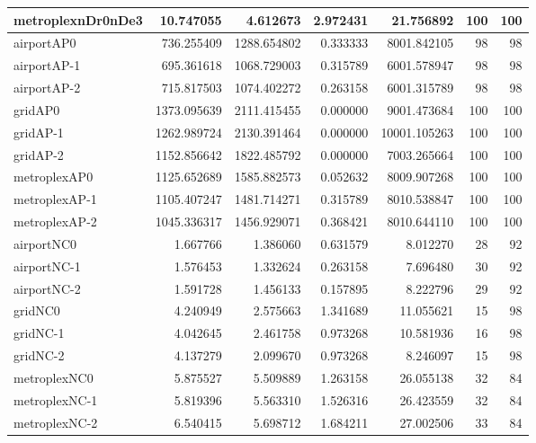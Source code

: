 \begin{longtable}{|l|r|r|r|r|r|r|}
metroplexnDr0nDe3 & 10.747055 & 4.612673 & 2.972431 & 21.756892 & 100 & 100 \\ \hline
airportAP0 & 736.255409 & 1288.654802 & 0.333333 & 8001.842105 & 98 & 98 \\ \hline
airportAP-1 & 695.361618 & 1068.729003 & 0.315789 & 6001.578947 & 98 & 98 \\ \hline
airportAP-2 & 715.817503 & 1074.402272 & 0.263158 & 6001.315789 & 98 & 98 \\ \hline
gridAP0 & 1373.095639 & 2111.415455 & 0.000000 & 9001.473684 & 100 & 100 \\ \hline
gridAP-1 & 1262.989724 & 2130.391464 & 0.000000 & 10001.105263 & 100 & 100 \\ \hline
gridAP-2 & 1152.856642 & 1822.485792 & 0.000000 & 7003.265664 & 100 & 100 \\ \hline
metroplexAP0 & 1125.652689 & 1585.882573 & 0.052632 & 8009.907268 & 100 & 100 \\ \hline
metroplexAP-1 & 1105.407247 & 1481.714271 & 0.315789 & 8010.538847 & 100 & 100 \\ \hline
metroplexAP-2 & 1045.336317 & 1456.929071 & 0.368421 & 8010.644110 & 100 & 100 \\ \hline
airportNC0 & 1.667766 & 1.386060 & 0.631579 & 8.012270 & 28 & 92 \\ \hline
airportNC-1 & 1.576453 & 1.332624 & 0.263158 & 7.696480 & 30 & 92 \\ \hline
airportNC-2 & 1.591728 & 1.456133 & 0.157895 & 8.222796 & 29 & 92 \\ \hline
gridNC0 & 4.240949 & 2.575663 & 1.341689 & 11.055621 & 15 & 98 \\ \hline
gridNC-1 & 4.042645 & 2.461758 & 0.973268 & 10.581936 & 16 & 98 \\ \hline
gridNC-2 & 4.137279 & 2.099670 & 0.973268 & 8.246097 & 15 & 98 \\ \hline
metroplexNC0 & 5.875527 & 5.509889 & 1.263158 & 26.055138 & 32 & 84 \\ \hline
metroplexNC-1 & 5.819396 & 5.563310 & 1.526316 & 26.423559 & 32 & 84 \\ \hline
metroplexNC-2 & 6.540415 & 5.698712 & 1.684211 & 27.002506 & 33 & 84 \\ \hline
\end{longtable}
